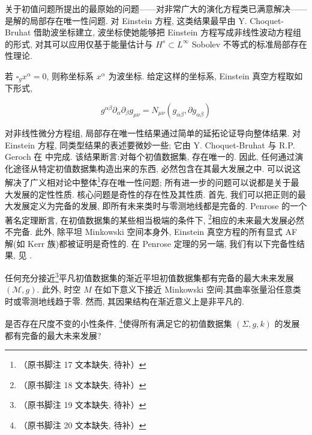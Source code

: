 关于初值问题所提出的最原始的问题——对非常广大的演化方程类已满意解决——是解的局部存在唯一性问题. 对 Einstein 方程, 这类结果最早由 Y. Choquet-Bruhat \cite{gfref7} 借助波坐标建立, 波坐标使她能够把 Einstein 方程写成非线性波动方程组的形式, 对其可以应用仅基于能量估计与 $H^s \subset L^{\infty}$ Sobolev 不等式的标准局部存在性理论. 

\begin{definition}\label{def:cG-3.5}
若 $\square_g x^\alpha = 0$, 则称坐标系 $x^{\alpha}$ 为波坐标. 给定这样的坐标系, Einstein 真空方程取如下形式, 

\begin{equation}
g ^ {\alpha \beta} \partial_ {\alpha} \partial_ {\beta} g _ {\mu \nu} = N _ {\mu \nu} (g _ {\alpha \beta},  \partial g _ {\alpha \beta})\label{eq:cG-64}
\end{equation}
\end{definition}

对非线性微分方程组, 局部存在唯一性结果通过简单的延拓论证导向整体结果. 对 Einstein 方程, 同类型结果的表述要微妙一些; 它由 Y. Choquet-Bruhat 与 R.P. Geroch 在 \cite{gfref8} 中完成. 该结果断言:对每个初值数据集, 存在唯一的. 因此, 任何通过演化途径从特定初值数据集构造出来的东西, 必然包含在其最大发展之中. 可以说这解决了广义相对论中整体\footnote{（原书脚注 17 文本缺失, 待补）}存在唯一性问题; 所有进一步的问题可以说都是关于最大发展的定性性质. 核心问题是奇性的存在性及其性质. 首先, 我们可以把正则的最大发展定义为完备的发展, 即所有未来类时与零测地线都是完备的. Penrose 的一个著名定理断言, 在初值数据集的某些相当极端的条件下, \footnote{（原书脚注 18 文本缺失, 待补）}相应的未来最大发展必然不完备. 此外, 除平坦 Minkowski 空间本身外, Einstein 真空方程的所有显式 AF 解(如 Kerr 族)都被证明是奇性的. 在 Penrose 定理的另一端, 我们有以下完备性结果, 见 \cite{gfref12}. 

\begin{theorem}\label{thm:cG-3.6}
任何充分接近\footnote{（原书脚注 19 文本缺失, 待补）}平凡初值数据集的渐近平坦初值数据集都有完备的最大未来发展 $(\mathcal{M},  g)$. 此外, 时空 $M$ 在如下意义下接近 Minkowski 空间:其曲率张量沿任意类时或零测地线趋于零. 然而, 其因果结构在渐近意义上是非平凡的. 
\end{theorem}

\begin{problem*}
是否存在尺度不变的小性条件, \footnote{（原书脚注 20 文本缺失, 待补）}使得所有满足它的初值数据集 $(\Sigma,  g,  k)$ 的发展都有完备的最大未来发展?
\end{problem*}

